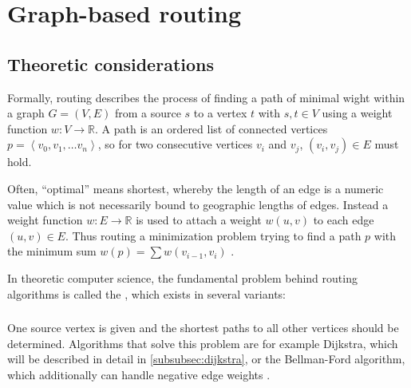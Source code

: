 \section{Graph-based routing}
\label{sec:graph-routing}

	\subsection{Theoretic considerations}
	\label{subsec:routing-theoretic-considerations}	
	
		Formally, routing describes the process of finding a path of minimal wight within a graph $G=(V, E)$ from a source $s$ to a vertex $t$ with $s, t \in V$ using a weight function $w: V \rightarrow \mathbb{R}$.
		A path is an ordered list of connected vertices $p=\left\langle v_0, v_1, \dots v_n \right\rangle$, so for two consecutive vertices $v_i$ and $v_j$, $(v_i, v_j) \in E$ must hold.
		
		Often, \enquote{optimal} means shortest, whereby the length of an edge is a numeric value which is not necessarily bound to geographic lengths of edges.
		Instead a weight function $w : E \rightarrow \mathbb{R}$ is used to attach a weight $w(u, v)$ to each edge $(u, v) \in E$.
		Thus routing a minimization problem trying to find a path $p$ with the minimum sum $w(p) = \sum{w(v_{i-1}, v_i)}$ \cite[645]{cormen-introduction-to-alg}.
		
		In theoretic computer science, the fundamental problem behind routing algorithms is called the , which exists in several variants\cite[644]{cormen-introduction-to-alg}:
		
		\subsubsection{}
		\label{subsubsec:single-source-shortest-path}
		
			One source vertex is given and the shortest paths to all other vertices should be determined.
			Algorithms that solve this problem are for example Dijkstra, which will be described in detail in \cref{subsubsec:dijkstra}, or the Bellman-Ford algorithm, which additionally can handle negative edge weights \cite[651]{cormen-introduction-to-alg}.
		
		\subsubsection{}
		
